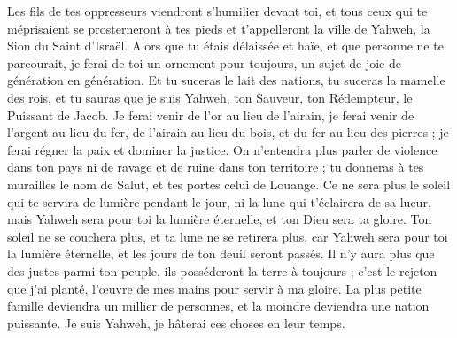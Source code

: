 \begin{multicols}{2}
Les fils de tes oppresseurs viendront s'humilier devant toi, et tous ceux qui te méprisaient se prosterneront à tes pieds et t'appelleront la ville de Yahweh, la Sion du Saint d'Israël.
Alors que tu étais délaissée et haïe, et que personne ne te parcourait, je ferai de toi un ornement pour toujours, un sujet de joie de génération en génération.
Et tu suceras le lait des nations, tu suceras la mamelle des rois, et tu sauras que je suis Yahweh, ton Sauveur, ton Rédempteur, le Puissant de Jacob.
Je ferai venir de l'or au lieu de l'airain, je ferai venir de l'argent au lieu du fer, de l'airain au lieu du bois, et du fer au lieu des pierres ; je ferai régner la paix et dominer la justice.
On n'entendra plus parler de violence dans ton pays ni de ravage et de ruine dans ton territoire ; tu donneras à tes murailles le nom de Salut, et tes portes celui de Louange.
Ce ne sera plus le soleil qui te servira de lumière pendant le jour, ni la lune qui t'éclairera de sa lueur, mais Yahweh sera pour toi la lumière éternelle, et ton Dieu sera ta gloire.
Ton soleil ne se couchera plus, et ta lune ne se retirera plus, car Yahweh sera pour toi la lumière éternelle, et les jours de ton deuil seront passés.
Il n'y aura plus que des justes parmi ton peuple, ils posséderont la terre à toujours ; c'est le rejeton que j'ai planté, l'œuvre de mes mains pour servir à ma gloire.
La plus petite famille deviendra un millier de personnes, et la moindre deviendra une nation puissante. Je suis Yahweh, je hâterai ces choses en leur temps.

\end{multicols}
